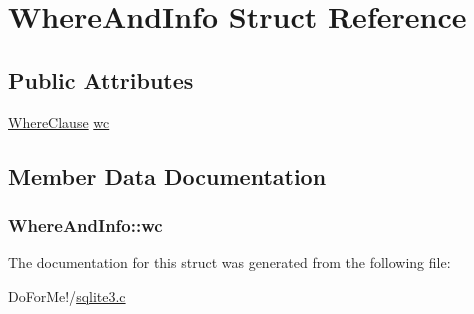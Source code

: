 \hypertarget{struct_where_and_info}{\section{Where\-And\-Info Struct Reference}
\label{struct_where_and_info}
}
\subsection*{Public Attributes}
\begin{DoxyCompactItemize}
\item 
\hyperlink{struct_where_clause}{Where\-Clause} \hyperlink{struct_where_and_info_a01cea99f069b1e598004a1cd0d0c3a80}{wc}
\end{DoxyCompactItemize}


\subsection{Member Data Documentation}
\hypertarget{struct_where_and_info_a01cea99f069b1e598004a1cd0d0c3a80}{
\subsubsection[{wc}]{ Where\-And\-Info\-::wc}}\label{struct_where_and_info_a01cea99f069b1e598004a1cd0d0c3a80}


The documentation for this struct was generated from the following file\-:\begin{DoxyCompactItemize}
\item 
Do\-For\-Me!/\hyperlink{sqlite3_8c}{sqlite3.\-c}\end{DoxyCompactItemize}
